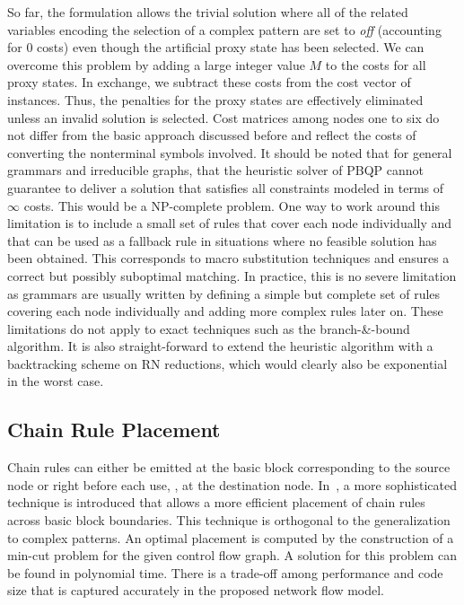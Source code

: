 So far, the formulation allows the trivial solution where all of the
related variables encoding the selection of a complex pattern are set
to \textit{off} (accounting for 0 costs) even though the artificial
proxy state has been selected. We can overcome this problem by adding
a large integer value $M$ to the costs for all proxy states. In
exchange, we subtract these costs from the cost vector of
instances. Thus, the penalties for the proxy states are effectively
eliminated unless an invalid solution is selected.
Cost matrices among nodes one to six do not differ from the basic
approach discussed before and reflect the costs of converting the
nonterminal symbols involved.
It should be noted that for general grammars and irreducible graphs,
that the heuristic solver of PBQP cannot guarantee to deliver a solution 
that satisfies all constraints modeled in terms of $\infty$ costs. This would be a
NP-complete problem. One way to work around this limitation is to
include a small set of rules that cover each node individually and
that can be used as a fallback rule in situations where no feasible
solution has been obtained. This corresponds to macro substitution
techniques and ensures a correct but possibly suboptimal matching. In
practice, this is no severe limitation as grammars are usually written
by defining a simple but complete set of rules covering each node
individually and adding more complex rules later on. These limitations
do not apply to exact techniques such as the branch-\&-bound algorithm. 
It is also straight-forward
to extend the heuristic algorithm with a backtracking scheme on RN
reductions, which would clearly also be exponential in the worst case.

\subsection{Chain Rule Placement}
\label{sec:chain_rule_placement}
Chain rules can either be emitted at the basic block corresponding to
the source node or right before each use, \ie, at the destination
node. In~\cite{1269857}, a more sophisticated technique is introduced
that allows a more efficient placement of chain rules across basic
block boundaries. This technique is orthogonal to the generalization
to complex patterns. An optimal placement is computed by the
construction of a min-cut problem for the given control flow graph. A
solution for this problem can be found in polynomial time. There is a
trade-off among performance and code size that is captured accurately
in the proposed network flow model.


